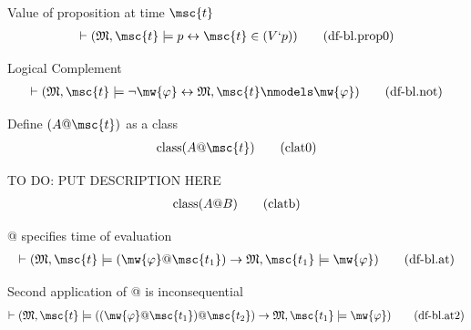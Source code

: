 \begin{metadefinition} Value of proposition at time
$\msc{t}$
\begin{align}
\vdash ( \mathfrak{M} , \msc{t} \models p \leftrightarrow \msc{t} \in ( V ` p )
    )\label{eq:df-bl.prop0}\tag{df-bl.prop0}
\end{align}
\end{metadefinition}

\begin{metadefinition} Logical Complement
\begin{align}
\vdash ( \mathfrak{M} , \msc{t} \models \lnot \mw{\varphi} \leftrightarrow
    \mathfrak{M} , \msc{t} \nmodels \mw{\varphi}
    )\label{eq:df-bl.not}\tag{df-bl.not}
\end{align}
\end{metadefinition}

\begin{metadefinition} Define $( A @ \msc{t} )$ as a class
\begin{align}
{\rm class} ( A @ \msc{t} )\label{eq:clat0}\tag{clat0}
\end{align}
\end{metadefinition}

\begin{metadefinition} TO DO: PUT DESCRIPTION HERE
\begin{align}
{\rm class} ( A @ B )\label{eq:clatb}\tag{clatb}
\end{align}
\end{metadefinition}

\begin{metadefinition} @ specifies time of evaluation
\begin{align}
\vdash ( \mathfrak{M} , \msc{t} \models ( \mw{\varphi} @ \msc{t_1} )
    \rightarrow \mathfrak{M} , \msc{t_1} \models \mw{\varphi}
    )\label{eq:df-bl.at}\tag{df-bl.at}
\end{align}
\end{metadefinition}

\begin{metadefinition} Second application of @ is
inconsequential
\begin{align}
\vdash ( \mathfrak{M} , \msc{t} \models ( ( \mw{\varphi} @ \msc{t_1} ) @
    \msc{t_2} ) \rightarrow \mathfrak{M} , \msc{t_1} \models \mw{\varphi}
    )\label{eq:df-bl.at2}\tag{df-bl.at2}
\end{align}
\end{metadefinition}

